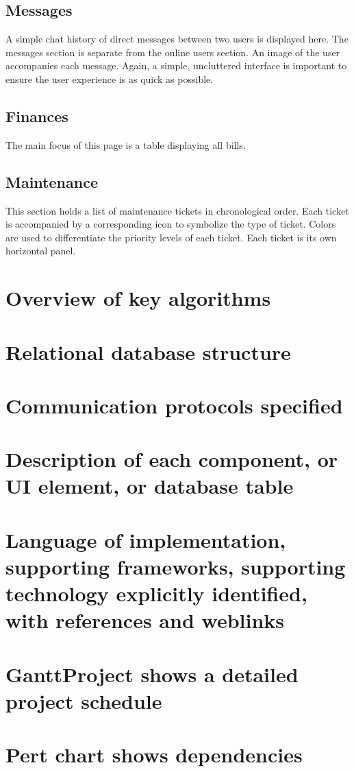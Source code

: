 \documentclass[12pt]{article}
\begin{document}
\subsection{Messages}
A simple chat history of direct messages between two users is displayed here. The messages section is separate from the online users section. An image of the user accompanies each message. Again, a simple, uncluttered interface is important to ensure the user experience is as quick as possible.

\subsection{Finances}
The main focus of this page is a table displaying all bills. 

\subsection{Maintenance}
This section holds a list of maintenance tickets in chronological order. Each ticket is accompanied by a corresponding icon to symbolize the type of ticket. Colors are used to differentiate the priority levels of each ticket. Each ticket is its own horizontal panel. 

%
\section{Overview of key algorithms}

%
\section{Relational database structure}

%
\section{Communication protocols specified}

%
\section{Description of each component, or UI element, or database table}

%
\section{Language of implementation, supporting frameworks, supporting technology explicitly identified, with references and web­links}

%
\section{GanttProject shows a detailed project schedule}

%
\section{Pert chart shows dependencies}
\end{document}
